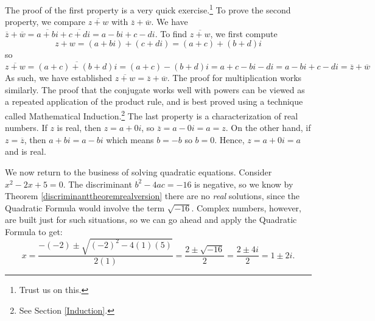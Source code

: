 \documentclass[10pt]{article}
\begin{document}
\smallskip

The proof of the first property is a very quick exercise.\footnote{Trust us on this.}  To prove the second property, we compare $\overline{z+w}$ with $\overline{z} + \overline{w}$.  We have $\overline{z} + \overline{w} = \overline{a+bi} + \overline{c+di}  = a-bi + c-di$.  To find $\overline{z+w}$, we first compute \[z+w = (a+bi) + (c+di) = (a+c)+(b+d)i\] so \[\overline{z+w} = \overline{(a+c)+(b+d)i} = (a+c) - (b+d)i = a+c - bi - di = a - bi + c - di = \overline{z} + \overline{w}\]  As such, we have established  $\overline{z+w} = \overline{z}+\overline{w}$. The proof for multiplication works similarly.  The proof that the conjugate works well with powers can be viewed as a repeated application of the product rule, and is best proved using a technique called Mathematical Induction.\footnote{See Section \ref{Induction}.}  The last property is a characterization of real numbers.  If $z$ is real, then $z = a + 0i$, so $\overline{z} = a - 0i = a = z$.  On the other hand, if $z=\overline{z}$, then $a+bi = a - bi$ which means $b=-b$ so $b=0$.  Hence, $z = a +0i = a$ and is real.

\medskip

We now return to the business of solving quadratic equations. Consider  $x^2-2x+5 = 0$. The discriminant $b^2 - 4ac = -16$ is negative, so we know by Theorem \ref{discriminanttheoremrealversion} there are no \textit{real} solutions, since the Quadratic Formula would involve the term $\sqrt{-16}$.  Complex numbers, however, are built just for such situations, so we can go ahead and apply the Quadratic Formula to get: \[ x = \dfrac{-(-2) \pm \sqrt{(-2)^2-4(1)(5)}}{2(1)} = \dfrac{2 \pm \sqrt{-16}}{2} = \dfrac{2 \pm 4i}{2} = 1 \pm 2i.\]  
\end{document}
